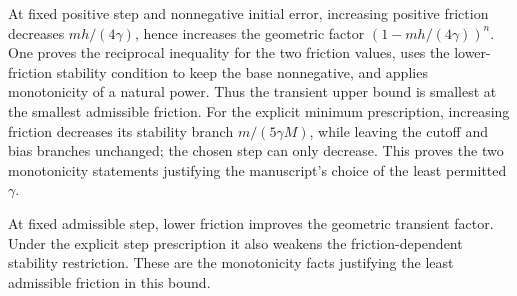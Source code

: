 \documentclass[11pt,a4paper]{article}
\begin{document}
At fixed positive step and nonnegative initial error, increasing positive friction decreases \(mh/(4\gamma)\), hence increases the geometric factor \((1-mh/(4\gamma))^n\). One proves the reciprocal inequality for the two friction values, uses the lower-friction stability condition to keep the base nonnegative, and applies monotonicity of a natural power. Thus the transient upper bound is smallest at the smallest admissible friction. For the explicit minimum prescription, increasing friction decreases its stability branch \(m/(5\gamma M)\), while leaving the cutoff and bias branches unchanged; the chosen step can only decrease. This proves the two monotonicity statements justifying the manuscript's choice of the least permitted \(\gamma\).



At fixed admissible step, lower friction improves the geometric transient factor. Under the explicit step prescription it also weakens the friction-dependent stability restriction. These are the monotonicity facts justifying the least admissible friction in this bound.
\end{document}

